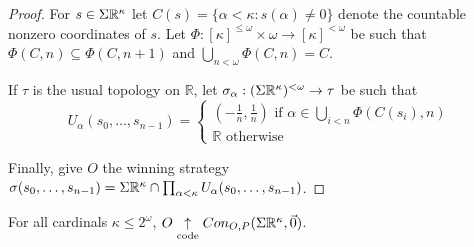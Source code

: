 \begin{proof}
For $s\in\Sigma\mathbb{R}^{\kappa}$ let $C(s)=\{\alpha<\kappa:s(\alpha)\not=0\}$ denote the countable nonzero coordinates of $s$. Let $\Phi:[\kappa]^{\leq\omega}\times\omega\to[\kappa]^{<\omega}$ be such that $\Phi(C,n)\subseteq\Phi(C,n+1)$ and $\bigcup_{n<\omega}\Phi(C,n)=C$.

If $\tau$ is the usual topology on $\mathbb{R}$, let $\sigma_\alpha:(\Sigma\mathbb{R}^{\kappa})^{<\omega}\to\tau$ be such that
\[
U_\alpha(s_0,\dots,s_{n-1})=\left\{
\begin{array}{l}
(-\frac{1}{n},\frac{1}{n}) \text{ if } \alpha\in\bigcup_{i<n}\Phi(C(s_i),n) \\
\mathbb{R} \text{ otherwise}
\end{array}
\right.
\]

Finally, give $O$ the winning strategy $\sigma(s_0,\dots,s_{n-1})=\Sigma\mathbb{R}^{\kappa}\cap\prod_{\alpha<\kappa}U_\alpha(s_0,\dots,s_{n-1})$.
\end{proof}

\begin{theorem}
For all cardinals $\kappa\leq 2^\omega$, $O\underset{\text{code}}{\uparrow}Con_{O,P}(\Sigma\mathbb{R}^{\kappa},\vec{0})$.
\end{theorem}

